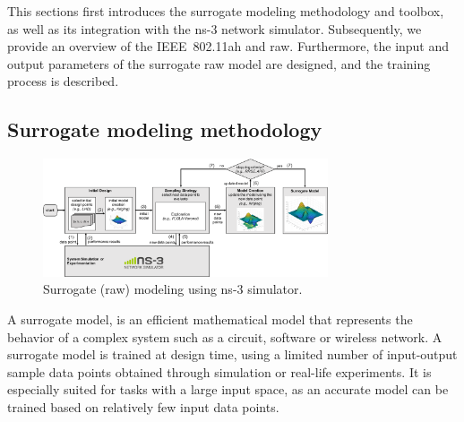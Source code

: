 


This sections first introduces the surrogate modeling methodology 
and toolbox, as well as its integration with the ns-3 network
simulator. Subsequently, we provide an overview of the IEEE~802.11ah and \gls{raw}. Furthermore, the input and output parameters of the surrogate \gls{raw} model are designed, and the training process is described. 


\subsection{Surrogate modeling methodology}


\begin{figure}[t]
  \centering
  \includegraphics[width=0.75\textwidth]{figures/surrogate_modeling_approach_raw}
  \caption{Surrogate (\gls{raw}) modeling using ns-3 simulator. \label{fig:sumo-ns3}}
\end{figure}

 A surrogate model, is an efficient mathematical model that represents the behavior of a complex system such as a circuit, software or wireless network. A surrogate model is trained at design time, using a limited number of input-output sample data points obtained through simulation or real-life experiments. It is especially suited for tasks with a large input space, as an accurate model can be trained based on relatively few input data points.
 

